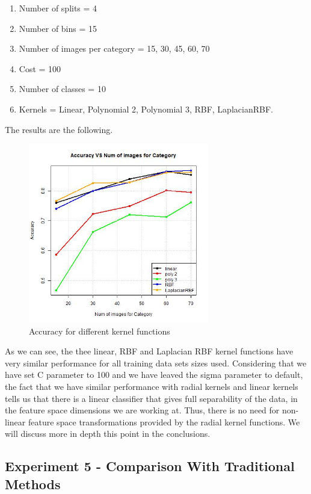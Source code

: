 \begin{enumerate}
    \item Number of splits = 4
    \item Number of bins = 15
    \item Number of images per category = 15, 30, 45, 60, 70
    \item Cost = 100
    \item Number of classes = 10
    \item Kernels = Linear, Polynomial 2, Polynomial 3, RBF, LaplacianRBF.  
\end{enumerate}

The results are the following.

\begin{figure}[H]
\centering
\includegraphics[width=0.7\textwidth]{Images/Kernel Methods.jpeg}
\caption{Accuracy for different kernel functions}
\end{figure}

As we can see, the thee linear, RBF and Laplacian RBF kernel functions have very similar performance for all training data sets sizes used. Considering that we have set C parameter to 100 and we have leaved the sigma parameter to default, the fact that we have similar performance with radial kernels and linear kernels tells us that there is a linear classifier that gives full separability of the data, in the feature space dimensions we are working at. Thus, there is no need for non-linear feature space transformations provided by the radial kernel functions. We will discuss more in depth this point in the conclusions. 


\subsection{Experiment 5 - Comparison With Traditional Methods}


